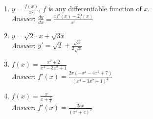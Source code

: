 \documentclass[11pt]{article}
\begin{document}
\begin{enumerate}
\begin{enumerate}


\item $y=\frac{f(x)}{x^2}$, $f$ is any differentiable function of $x$.\\

{\em Answer}: $\frac{dy}{dx}=\frac{xf'(x)-2f(x)}{x^3}$\\ 

\item $y=\sqrt{2}\cdot x+\sqrt{3x}$\\

{\em Answer}: $y'=\sqrt{2}+\frac{\sqrt{3}}{2\sqrt{x}}$\\



\item $f(x)=\frac{x^2+2}{x^4-3x^2+1}$\\

{\em Answer}: $f'(x)=\frac{2x(-x^4-4x^2+7)}{(x^4-3x^2+1)^2}$\\



%


\item $f(x)=\frac{x}{x+\frac{c}{x}}$\\

{\em Answer}: $f'(x)=\frac{2cx}{(x^2+c)^2}$\\




\end{enumerate}
\end{enumerate}
\end{document}
